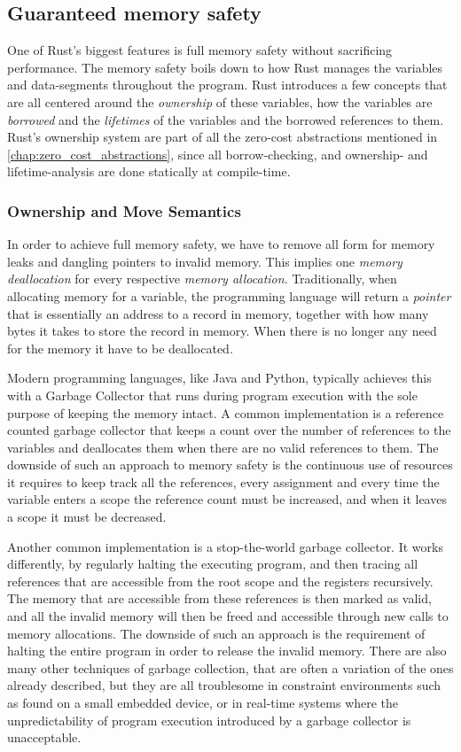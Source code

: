 \subsection{Guaranteed memory safety}

One of Rust's biggest features is full memory safety \cite{web:rust_book_unsafe} without sacrificing performance.
The memory safety boils down to how Rust manages the variables and data-segments throughout the program.
Rust introduces a few concepts that are all centered around the \emph{ownership} of these variables, how the variables are \emph{borrowed} and the \emph{lifetimes} of the variables and the borrowed references to them.
Rust's ownership system are part of all the zero-cost abstractions mentioned in \autoref{chap:zero_cost_abstractions}, since all borrow-checking, and ownership- and lifetime-analysis are done statically at compile-time.

\subsubsection{Ownership and Move Semantics} \hfill

In order to achieve full memory safety, we have to remove all form for memory leaks and dangling pointers to invalid memory.
This implies one \emph{memory deallocation} for every respective \emph{memory allocation}.
Traditionally, when allocating memory for a variable, the programming language will return a \emph{pointer} that is essentially an address to a record in memory, together with how many bytes it takes to store the record in memory.
When there is no longer any need for the memory it have to be deallocated.

Modern programming languages, like Java and Python, typically achieves this with a Garbage Collector that runs during program execution with the sole purpose of keeping the memory intact.
A common implementation is a reference counted garbage collector that keeps a count over the number of references to the variables and deallocates them when there are no valid references to them.
The downside of such an approach to memory safety is the continuous use of resources it requires to keep track all the references, every assignment and every time the variable enters a scope the reference count must be increased, and when it leaves a scope it must be decreased.

Another common implementation is a stop-the-world garbage collector.
It works differently, by regularly halting the executing program, and then tracing all references that are accessible from the root scope and the registers recursively.
The memory that are accessible from these references is then marked as valid, and all the invalid memory will then be freed and accessible through new calls to memory allocations.
The downside of such an approach is the requirement of halting the entire program in order to release the invalid memory.
There are also many other techniques of garbage collection, that are often a variation of the ones already described, but they are all troublesome in constraint environments such as found on a small embedded device, or in real-time systems where the unpredictability of program execution introduced by a garbage collector is unacceptable.

